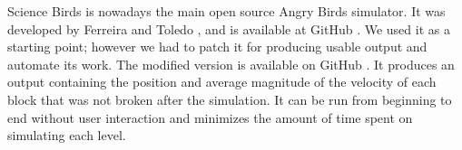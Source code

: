 \documentclass[runningheads,a4paper]{llncs}
\begin{document}








Science Birds is nowadays the main open source Angry Birds simulator. It was developed by
Ferreira and Toledo \cite{ferreira2014search}, and is available at
GitHub \cite{sciencebirds}. We used it  as a starting point; however we
had to patch it for producing usable output 
and automate its work. The modified 
version is available on GitHub \cite{sciencebirds-adapt}. It produces an output 
containing the position and average magnitude of the velocity of each block 
that was not broken after the simulation. It can be run from beginning to end 
without user interaction and minimizes the amount of time spent on simulating 
each level.
\end{document}
